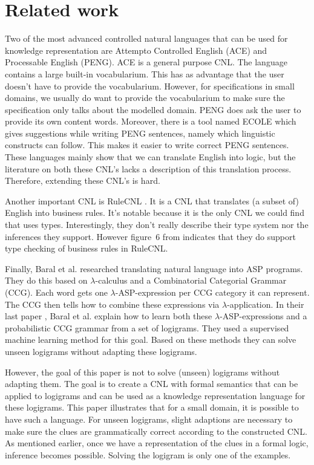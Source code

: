 \section{Related work}

Two of the most advanced controlled natural languages that can be used for knowledge representation are Attempto Controlled English (ACE) and Processable English (PENG). ACE \cite{Fuchs2008} is a general purpose CNL. The language contains a large built-in vocabularium. This has as advantage that the user doesn't have to provide the vocabularium. However, for specifications in small domains, we usually do want to provide the vocabularium to make sure the specification only talks about the modelled domain. PENG \cite{Schwitter2002} does ask the user to provide its own content words. Moreover, there is a tool named ECOLE which gives suggestions while writing PENG sentences, namely which linguistic constructs can follow. This makes it easier to write correct PENG sentences. These languages mainly show that we can translate English into logic, but the literature on both these CNL's lacks a description of this translation process. Therefore, extending these CNL's is hard.

Another important CNL is RuleCNL \cite{Njonko2014}. It is a CNL that translates (a subset of) English into business rules. It's notable because it is the only CNL we could find that uses types. Interestingly, they don't really describe their type system nor the inferences they support. However figure~6 from \cite{Njonko2014} indicates that they do support type checking of business rules in RuleCNL.

Finally, Baral et al. \cite{Baral2008, Costantini2010, Baral2012, Baral2012a} researched translating natural language into ASP programs. They do this based on $\lambda$-calculus and a Combinatorial Categorial Grammar (CCG). Each word gets one $\lambda$-ASP-expression per CCG category it can represent. The CCG then tells how to combine these expressions via $\lambda$-application. In their last paper \cite{Baral2012a}, Baral et al. explain how to learn both these $\lambda$-ASP-expressions and a probabilistic CCG grammar from a set of logigrams. They used a supervised machine learning method for this goal. Based on these methods they can solve unseen logigrams without adapting these logigrams.

However, the goal of this paper is not to solve (unseen) logigrams without adapting them. The goal is to create a CNL with formal semantics that can be applied to logigrams and can be used as a knowledge representation language for these logigrams. This paper illustrates that for a small domain, it is possible to have such a language. For unseen logigrams, slight adaptions are necessary to make sure the clues are grammatically correct according to the constructed CNL. As mentioned earlier, once we have a representation of the clues in a formal logic, inference becomes possible. Solving the logigram is only one of the examples.
